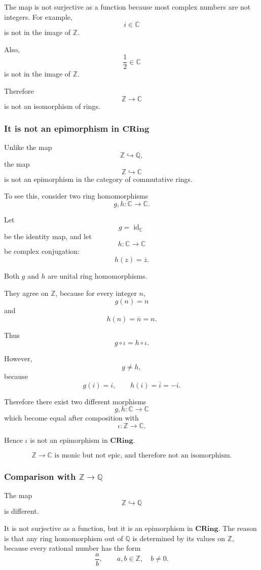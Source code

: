 \documentclass[12pt,a4paper]{article}
\theoremstyle{notespace}
\begin{document}
The map is not surjective as a function because most complex numbers are not integers. For example,
\[
i\in \mathbb C
\]
is not in the image of \(\mathbb Z\).

Also,
\[
\frac{1}{2}\in \mathbb C
\]
is not in the image of \(\mathbb Z\).

Therefore
\[
\mathbb Z\to \mathbb C
\]
is not an isomorphism of rings.

\subsubsection*{It is not an epimorphism in \(\mathbf{CRing}\)}

Unlike the map
\[
\mathbb Z\hookrightarrow \mathbb Q,
\]
the map
\[
\mathbb Z\hookrightarrow \mathbb C
\]
is not an epimorphism in the category of commutative rings.

To see this, consider two ring homomorphisms
\[
g,h:\mathbb C\to \mathbb C.
\]

Let
\[
g=\operatorname{id}_{\mathbb C}
\]
be the identity map, and let
\[
h:\mathbb C\to \mathbb C
\]
be complex conjugation:
\[
h(z)=\overline z.
\]

Both \(g\) and \(h\) are unital ring homomorphisms.

They agree on \(\mathbb Z\), because for every integer \(n\),
\[
g(n)=n
\]
and
\[
h(n)=\overline n=n.
\]

Thus
\[
g\circ \iota=h\circ \iota.
\]

However,
\[
g\neq h,
\]
because
\[
g(i)=i,
\qquad
h(i)=\overline i=-i.
\]

Therefore there exist two different morphisms
\[
g,h:\mathbb C\to \mathbb C
\]
which become equal after composition with
\[
\iota:\mathbb Z\to \mathbb C.
\]

Hence \(\iota\) is not an epimorphism in \(\mathbf{CRing}\).

\[
\boxed{
	\mathbb Z\to \mathbb C
	\text{ is monic but not epic, and therefore not an isomorphism.}
}
\]

\subsubsection*{Comparison with \(\mathbb Z\to \mathbb Q\)}

The map
\[
\mathbb Z\hookrightarrow \mathbb Q
\]
is different.

It is not surjective as a function, but it is an epimorphism in \(\mathbf{CRing}\). The reason is that any ring homomorphism out of \(\mathbb Q\) is determined by its values on \(\mathbb Z\), because every rational number has the form
\[
\frac{a}{b},
\qquad a,b\in\mathbb Z,\quad b\neq 0.
\]
\end{document}
